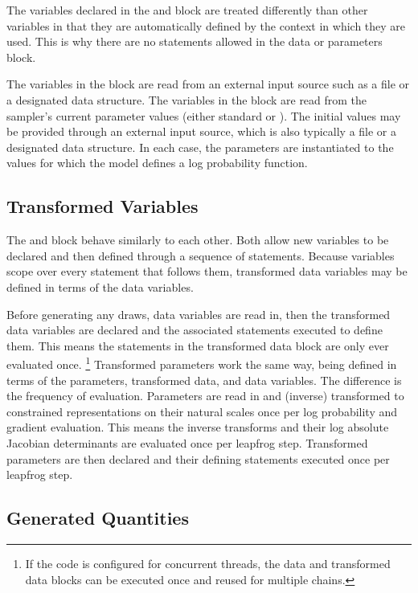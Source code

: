 The variables declared in the  and  block
are treated differently than other variables in that they are
automatically defined by the context in which they are used.  This is
why there are no statements allowed in the data or parameters block.

The variables in the  block are read from an external input
source such as a file or a designated \R data structure.  The
variables in the  block are read from the sampler's
current parameter values (either standard \HMC or \NUTS).  The initial
values may be provided through an external input source, which is also
typically a file or a designated \R data structure.  In each case, the
parameters are instantiated to the values for which the model defines
a log probability function.

\subsection{Transformed Variables}

The  and  block
behave similarly to each other.  Both allow new variables to be
declared and then defined through a sequence of statements.  Because
variables scope over every statement that follows them, transformed
data variables may be defined in terms of the data variables.

Before generating any draws, data variables are read in, then the
transformed data variables are declared and the associated statements
executed to define them.  This means the statements in the transformed
data block are only ever evaluated once.%
%
\footnote{If the \Cpp code is configured for concurrent threads, the
  data and transformed data blocks can be executed once and reused for
  multiple chains.}
%
Transformed parameters work the same way, being defined in terms of
the parameters, transformed data, and data variables.  The difference
is the frequency of evaluation.  Parameters are read in and (inverse)
transformed to constrained representations on their natural scales
once per log probability and gradient evaluation.  This means the
inverse transforms and their log absolute Jacobian determinants are
evaluated once per leapfrog step.  Transformed parameters are then
declared and their defining statements executed once per leapfrog
step.

\subsection{Generated Quantities}

